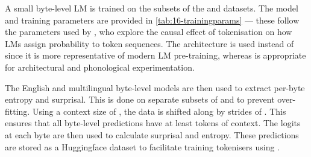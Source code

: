 
A small byte-level LM is trained on the subsets of the \fineweb and \commoncorpus datasets. The model and training parameters are provided in \cref{tab:16-trainingparams} --- these follow the parameters used by \citet{lesci2025causal}, who explore the causal effect of tokenisation on how LMs assign probability to token sequences. The \llama architecture is used instead of \gpt since it is more representative of modern LM pre-training, whereas \gpt is appropriate for architectural and phonological experimentation.


The English and multilingual byte-level models are then used to extract per-byte entropy and surprisal. This is done on separate subsets of \fineweb and \commoncorpus to prevent over-fitting. Using a context size of , the data is shifted along by strides of . This ensures that all byte-level predictions have at least  tokens of context. The logits at each byte are then used to calculate surprisal and entropy. These predictions are stored as a Huggingface dataset to facilitate training tokenisers using \bytespan.

